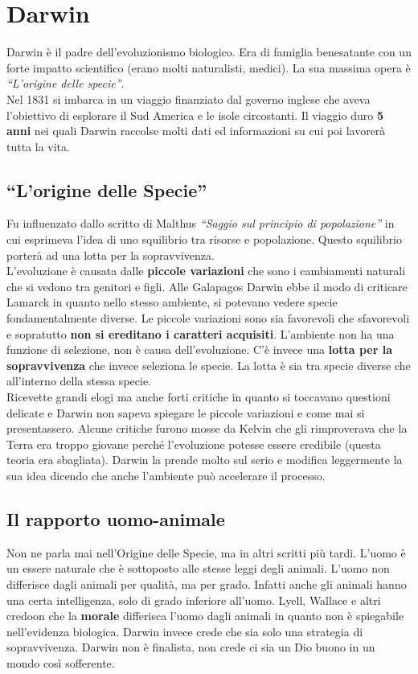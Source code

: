 
\section{Darwin}
Darwin è il padre dell'evoluzionismo biologico. Era di famiglia benesatante con un forte impatto
scientifico (erano molti naturalisti, medici). La sua massima opera è \textit{``L'origine delle 
specie''}.\\
Nel 1831 si imbarca in un viaggio finanziato dal governo inglese che aveva l'obiettivo di esplorare
il Sud America e le isole circostanti. Il viaggio duro \textbf{5 anni} nei quali Darwin raccolse 
molti dati ed informazioni su cui poi lavorerà tutta la vita.

\subsection{``L'origine delle Specie''}
Fu influenzato dallo scritto di Malthus \textit{``Saggio sul principio di popolazione''} in cui 
esprimeva l'idea di uno squilibrio tra risorse e popolazione. Questo squilibrio porterà ad una lotta
per la sopravvivenza.\\
L'evoluzione è causata dalle \textbf{piccole variazioni} che sono i cambiamenti naturali che si 
vedono tra genitori e figli. Alle Galapagos Darwin ebbe il modo di criticare Lamarck in quanto nello
stesso ambiente, si potevano vedere specie fondamentalmente diverse. Le piccole variazioni sono sia 
favorevoli che sfavorevoli e sopratutto \textbf{non si ereditano i caratteri acquisiti}. L'ambiente
non ha una funzione di selezione, non è causa dell'evoluzione. C'è invece una \textbf{lotta per la
sopravvivenza} che invece seleziona le specie. La lotta è sia tra specie diverse che all'interno 
della stessa specie.\\ [\baselineskip]
Ricevette grandi elogi ma anche forti critiche in quanto si toccavano questioni delicate e Darwin
non sapeva spiegare le piccole variazioni e come mai si presentassero. Alcune critiche furono mosse
da Kelvin che gli rimproverava che la Terra era troppo giovane perché l'evoluzione potesse essere
credibile (questa teoria era sbagliata). Darwin la prende molto sul serio e modifica leggermente la 
sua idea dicendo che anche l'ambiente può accelerare il processo.

\subsection{Il rapporto uomo-animale}
Non ne parla mai nell'Origine delle Specie, ma in altri scritti più tardi. L'uomo è un essere 
naturale che è sottoposto alle stesse leggi degli animali. L'uomo non differisce dagli animali per
qualità, ma per grado. Infatti anche gli animali hanno una certa intelligenza, solo di grado 
inferiore all'uomo. Lyell, Wallace e altri credoon che la \textbf{morale} differisca l'uomo dagli 
animali in quanto non è spiegabile nell'evidenza biologica. Darwin invece crede che sia solo una
strategia di sopravvivenza. Darwin non è finalista, non crede ci sia un Dio buono in un mondo così
sofferente.
